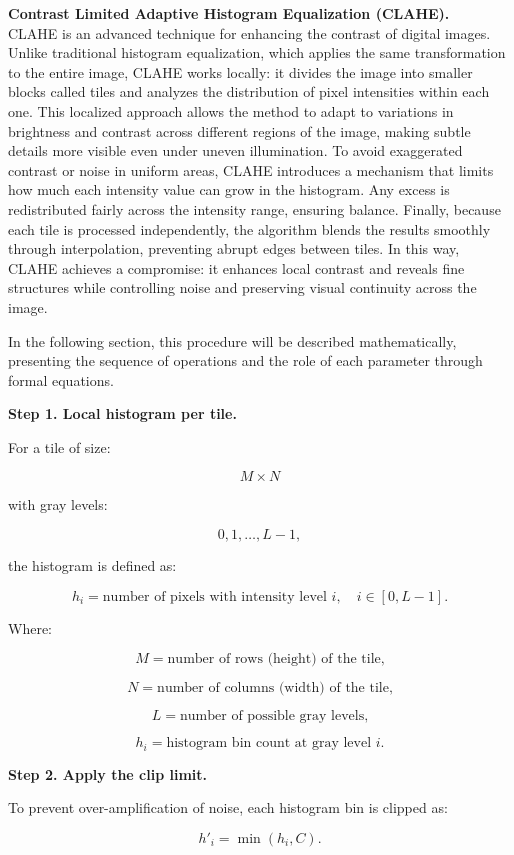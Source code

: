 \documentclass[11pt]{article}
\begin{document}
\textbf{Contrast Limited Adaptive Histogram Equalization (CLAHE).}\\
CLAHE is an advanced technique for enhancing the contrast of digital
images. Unlike traditional histogram equalization, which applies the
same transformation to the entire image, CLAHE works locally: it divides
the image into smaller blocks called tiles and analyzes the distribution
of pixel intensities within each one. This localized approach allows the
method to adapt to variations in brightness and contrast across
different regions of the image, making subtle details more visible even
under uneven illumination. To avoid exaggerated contrast or noise in
uniform areas, CLAHE introduces a mechanism that limits how much each
intensity value can grow in the histogram. Any excess is redistributed
fairly across the intensity range, ensuring balance. Finally, because
each tile is processed independently, the algorithm blends the results
smoothly through interpolation, preventing abrupt edges between tiles.
In this way, CLAHE achieves a compromise: it enhances local contrast and
reveals fine structures while controlling noise and preserving visual
continuity across the image.

In the following section, this procedure will be described
mathematically, presenting the sequence of operations and the role of
each parameter through formal equations.

\textbf{Step 1. Local histogram per tile.}

For a tile of size:

\[
M \times N
\]

with gray levels:

\[
0,1,\dots,L-1,
\]

the histogram is defined as:

\[
h_i = \text{number of pixels with intensity level } i, \quad i \in [0,L-1].
\]

Where:

\[
M = \text{number of rows (height) of the tile,}
\]

\[
N = \text{number of columns (width) of the tile,}
\]

\[
L = \text{number of possible gray levels,}
\]

\[
h_i = \text{histogram bin count at gray level } i.
\]

\textbf{Step 2. Apply the clip limit.}

To prevent over-amplification of noise, each histogram bin is clipped
as:

\[
h'_i = \min(h_i, C).
\]
\end{document}
